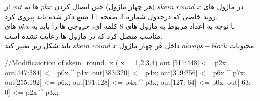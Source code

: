 در ماژول های $skein\_round\_x$ (هر چهار ماژول) حین اتصال کردن $pkx$ ها به $out$ از روند خاصی که درجدول شماره 3 صفحه 11 منبع ذکر شده باید پیروی کرد.\\
با توجه به اعداد مربوط به ماژول های 8 کلمه ای، خروجی ها را باید به $pkx$ های مناسب متصل کرد که در ماژول ها رعایت نشده است.\\
محتویات $always-block$ داخل هر چهار ماژول $skein\_round\_x$ باید شکل زیر تغییر کند:
\begin{code}
	//Modificaiotion of skein_round_x ( x = 1,2,3,4)	
	out [511:448] <= p2x;
	out[447:384] <= p0x ^ p1x;
	out[383:320] <= p4x;
	out[319:256] <= p6x ^ p7x;
	out[255:192] <= p6x;
	out[191:128] <= p4x ^ p3x;
	out[127: 64] <= p0x;
	out[ 63:  0] <= p2x ^ p3x;
\end{code}
